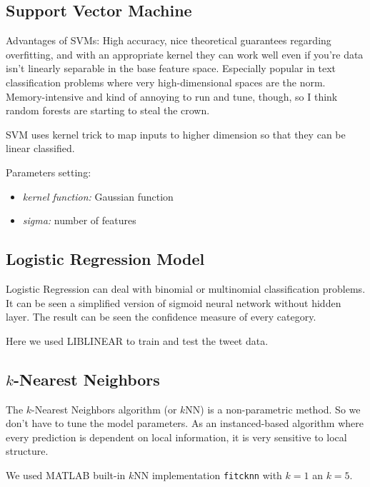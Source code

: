 \documentclass[letterpaper,11pt,twocolumn]{article}
\begin{document}
\subsection{Support Vector Machine}
Advantages of SVMs: High accuracy, nice theoretical guarantees regarding overfitting, and with an appropriate kernel they can work well even if you're data isn't linearly separable in the base feature space. Especially popular in text classification problems where very high-dimensional spaces are the norm. Memory-intensive and kind of annoying to run and tune, though, so I think random forests are starting to steal the crown.

SVM uses kernel trick to map inputs to higher dimension so that they can be linear classified.

Parameters setting:
\begin{itemize} 
\item \emph{kernel function:} Gaussian function
\item \emph{sigma:} number of features
\end{itemize}

\subsection{Logistic Regression Model}
Logistic Regression can deal with binomial or multinomial classification problems. It can be seen a simplified version of sigmoid neural network without hidden layer. The result can be seen the confidence measure of every category.

Here we used LIBLINEAR to train and test the tweet data.

\subsection{$k$-Nearest Neighbors}
The $k$-Nearest Neighbors algorithm (or $k$NN) is a non-parametric method. So we don't have to tune the model parameters. As an instanced-based algorithm where every prediction is dependent on local information, it is very sensitive to local structure.

We used MATLAB built-in $k$NN implementation \texttt{fitcknn} with $k = 1$ an $k = 5$.
\end{document}
